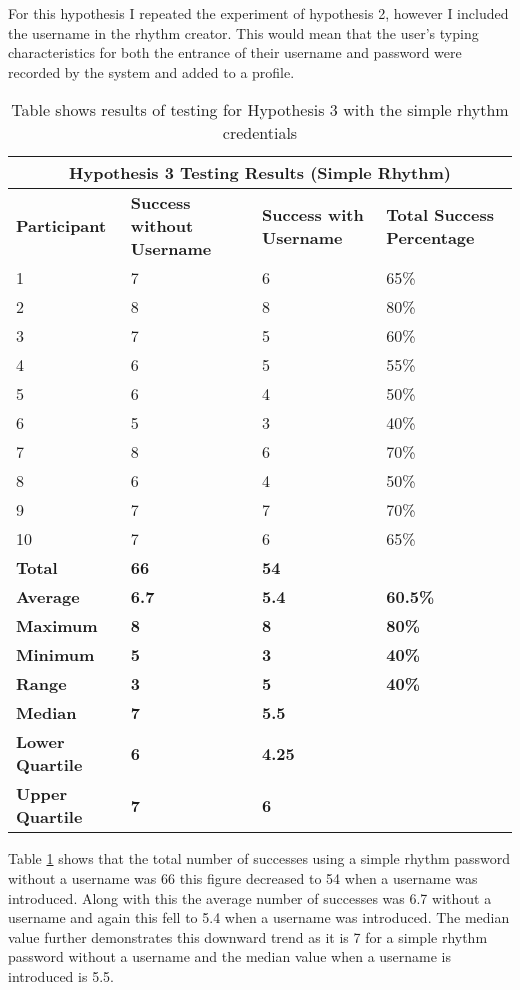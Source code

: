 \documentclass{article}
\begin{document}
For this hypothesis I repeated the experiment of hypothesis 2, however I included the username in the rhythm creator. This would mean that the user's typing characteristics for both the entrance of their username and password were recorded by the system and added to a profile.  

{
\begin{table} [H]
\centering
\begin{tabular}{ |p{2cm}|p{4cm}|p{4cm}| p{4cm} | }
\hline
\multicolumn{4}{|c|}{\textbf{Hypothesis 3 Testing Results (Simple Rhythm)}} \\
\hline
\textbf{Participant} & \textbf{Success without Username} & \textbf{Success with Username} & \textbf{Total Success Percentage} \\
\hline
1 & 7 & 6 & 65\% \\
\hline
2 & 8 & 8 & 80\% \\
\hline
3 & 7 & 5 & 60\% \\
\hline
4 & 6 & 5 & 55\%  \\
\hline
5 & 6 & 4 & 50\% \\
\hline
6 & 5 & 3 & 40\% \\
\hline
7 & 8 & 6 & 70\% \\
\hline
8 & 6 & 4 & 50\% \\
\hline
9 & 7 & 7 & 70\% \\
\hline
10 & 7 & 6 & 65\% \\
\hline
\textbf{Total} & \textbf{66} & \textbf{54} & \\
\hline
\textbf{Average} & \textbf{6.7} & \textbf{5.4} & \textbf{60.5\%} \\
\hline
\textbf{Maximum} & \textbf{8} & \textbf{8} & \textbf{80\%} \\
\hline
\textbf{Minimum} & \textbf{5} & \textbf{3} & \textbf{40\%} \\
\hline
\textbf{Range} & \textbf{3} & \textbf{5} & \textbf{40\%} \\
\hline
\textbf{Median} & \textbf{7} & \textbf{5.5} & \\
\hline
\textbf{Lower Quartile} & \textbf{6} & \textbf{4.25} & \\
\hline
\textbf{Upper Quartile} & \textbf{7} & \textbf{6} & \\
\hline
\end{tabular}
\caption{Table shows results of testing for Hypothesis 3 with the simple rhythm credentials}
\label{table:3}
\end{table}
}

Table \ref{table:3} shows that the total number of successes using a simple rhythm password without a username was 66 this figure decreased to 54 when a username was introduced. Along with this the average number of successes was 6.7 without a username and again this fell to 5.4 when a username was introduced. The median value further demonstrates this downward trend as it is 7 for a simple rhythm password without a username and the median value when a username is introduced is 5.5.  
\end{document}
